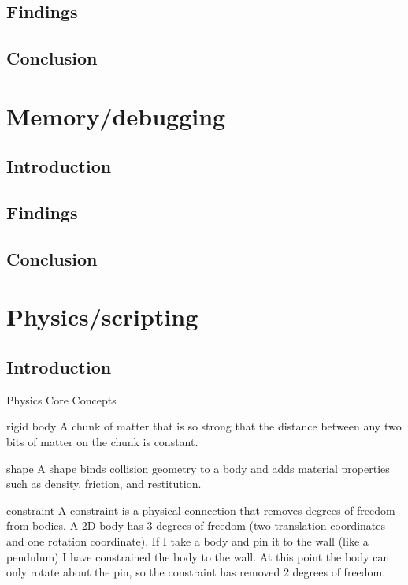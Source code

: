 \documentclass{projdoc}
\begin{document}
\subsection{Findings}

\subsection{Conclusion}

\section{Memory/debugging}

\subsection{Introduction}

\subsection{Findings}

\subsection{Conclusion}

\section{Physics/scripting}

\subsection{Introduction}

Physics Core Concepts

rigid body
A chunk of matter that is so strong that the distance between any two bits of matter on the chunk is constant.

shape
A shape binds collision geometry to a body and adds material properties such as density, friction, and restitution.

constraint
A constraint is a physical connection that removes degrees of freedom from bodies. A 2D body has 3 degrees of freedom (two translation coordinates and one rotation coordinate). If I take a body and pin it to the wall (like a pendulum) I have constrained the body to the wall. At this point the body can only rotate about the pin, so the constraint has removed 2 degrees of freedom.
\end{document}
